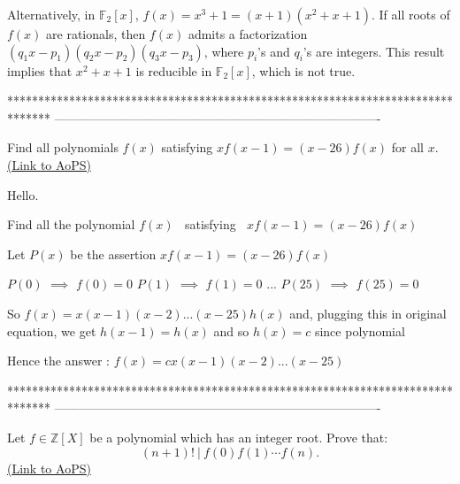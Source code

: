 \begin{solution}
	Alternatively, in $\mathbb{F}_2[x]$, $f(x)=x^3+1=(x+1)\left(x^2+x+1\right)$.  If all roots of $f(x)$ are rationals, then $f(x)$ admits a factorization $\left(q_1x-p_1\right)\left(q_2x-p_2\right)\left(q_3x-p_3\right)$, where $p_i$'s and $q_i$'s are integers.  This result implies that $x^2+x+1$ is reducible in $\mathbb{F}_2[x]$, which is not true.
\end{solution}
*******************************************************************************
-------------------------------------------------------------------------------

\begin{problem}
	Find all polynomials $f(x)$ satisfying $xf(x-1)=(x-26)f(x)$ for all $x$.
	\flushright \href{https://artofproblemsolving.com/community/c6h393860}{(Link to AoPS)}
\end{problem}



\begin{solution}
	\begin{tcolorbox}Hello.

Find all the polynomial $f(x)$ $~$ satisfying $~$ $xf(x-1)=(x-26)f(x)$\end{tcolorbox}
Let $P(x)$ be the assertion $xf(x-1)=(x-26)f(x)$

$P(0)$ $\implies$ $f(0)=0$
$P(1)$ $\implies$ $f(1)=0$
...
$P(25)$ $\implies$ $f(25)=0$

So $f(x)=x(x-1)(x-2)...(x-25)h(x)$ and, plugging this in original equation, we get $h(x-1)=h(x)$ and so $h(x)=c$ since polynomial

Hence the answer : $\boxed{f(x)=cx(x-1)(x-2)...(x-25)}$
\end{solution}
*******************************************************************************
-------------------------------------------------------------------------------

\begin{problem}
	Let $f\in \mathbb{Z}[X]$ be a polynomial which has an integer root. Prove that:
\[(n+1)!\ |\ f(0)f(1)\cdots f(n).\]
	\flushright \href{https://artofproblemsolving.com/community/c6h394360}{(Link to AoPS)}
\end{problem}



